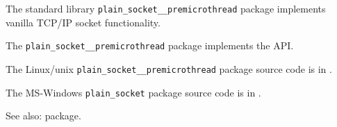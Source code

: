 
The standard library {\tt plain\_socket\_\_premicrothread} package implements vanilla {\sc TCP/IP} socket functionality.

The {\tt plain\_socket\_\_premicrothread} package implements the  API.

The Linux/unix {\tt plain\_socket\_\_premicrothread} package source code is in .

The {\sc MS-Windows} {\tt plain\_socket} package source code is in .

See also:  package.




